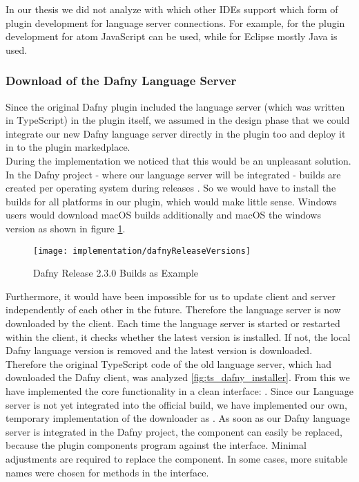 In our thesis we did not analyze with which other IDEs support which form of plugin development for language server connections.
For example, for the plugin development for atom JavaScript \cite{plugin-atom} can be used,
while for Eclipse mostly Java \cite{plugin-eclipse} is used.

\subsubsection{Download of the Dafny Language Server}
\label{section:implementation:client:download}
Since the original Dafny plugin included the language server (which was written in TypeScript) in the plugin itself,
we assumed in the design phase that we could integrate our new Dafny language server directly in the plugin too
and deploy it in to the plugin markedplace. \\

During the implementation we noticed that this would be an unpleasant solution.
In the Dafny project - where our language server will be integrated - builds
are created per operating system during releases \cite{dafny_lang_builds}.
So we would have to install the builds for all platforms in our plugin,
which would make little sense.
Windows users would download macOS builds additionally and macOS the windows version as shown in figure \ref{fig:dafnyReleaseVersions}.

\begin{figure}[H]
    \centering
    \texttt{[image: implementation/dafnyReleaseVersions]}
    \caption{Dafny Release 2.3.0 Builds as Example}
    \label{fig:dafnyReleaseVersions}
\end{figure}

Furthermore, it would have been impossible for us to update client and server independently of each other in the future.
Therefore the language server is now downloaded by the client.
Each time the language server is started or restarted within the client,
it checks whether the latest version is installed.
If not, the local Dafny language version is removed and the latest version is downloaded. \\

Therefore the original TypeScript code of the old language server,
which had downloaded the Dafny client, was analyzed \ref{fig:ts_dafny_installer}.
From this we have implemented the core functionality in a clean interface: .
Since our Language server is not yet integrated into the official build,
we have implemented our own, temporary implementation of the downloader as .
As soon as our Dafny language server is integrated in the Dafny project,
the component can easily be replaced, because the plugin components program against the interface.
Minimal adjustments are required to replace the component. In some cases, more suitable names were chosen for methods in the interface.

